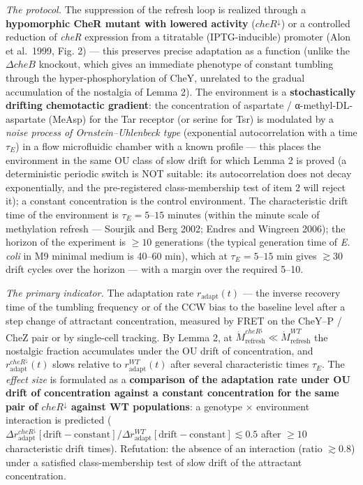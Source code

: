 \documentclass[pdflatex,sn-mathphys-ay]{sn-jnl}
\begin{document}
\emph{The protocol.} The suppression of the refresh loop is realized through a \textbf{hypomorphic CheR mutant with lowered activity} (\(cheR^{\downarrow}\)) or a controlled reduction of \emph{cheR} expression from a titratable (IPTG-inducible) promoter (Alon et al.~1999, Fig. 2) --- this preserves precise adaptation as a function (unlike the \(\Delta cheB\) knockout, which gives an immediate phenotype of constant tumbling through the hyper-phosphorylation of CheY, unrelated to the gradual accumulation of the nostalgia of Lemma 2). The environment is a \textbf{stochastically drifting chemotactic gradient}: the concentration of aspartate / α-methyl-DL-aspartate (MeAsp) for the Tar receptor (or serine for Tsr) is modulated by a \emph{noise process of Ornstein--Uhlenbeck type} (exponential autocorrelation with a time \(\tau_E\)) in a flow microfluidic chamber with a known profile --- this places the environment in the same OU class of slow drift for which Lemma 2 is proved (a deterministic periodic switch is NOT suitable: its autocorrelation does not decay exponentially, and the pre-registered class-membership test of item 2 will reject it); a constant concentration is the control environment. The characteristic drift time of the environment is \(\tau_E = 5\)--\(15\) minutes (within the minute scale of methylation refresh --- Sourjik and Berg 2002; Endres and Wingreen 2006); the horizon of the experiment is \(\ge 10\) generations (the typical generation time of \emph{E. coli} in M9 minimal medium is 40--60 min), which at \(\tau_E = 5\)--\(15\) min gives \(\gtrsim 30\) drift cycles over the horizon --- with a margin over the required 5--10.



\emph{The primary indicator.} The adaptation rate \(r_{\text{adapt}}(t)\) --- the inverse recovery time of the tumbling frequency or of the CCW bias to the baseline level after a step change of attractant concentration, measured by FRET on the CheY--P / CheZ pair or by single-cell tracking. By Lemma 2, at \(\dot M_{\text{refresh}}^{cheR^{\downarrow}} \ll \dot M_{\text{refresh}}^{WT}\) the nostalgic fraction accumulates under the OU drift of concentration, and \(r_{\text{adapt}}^{cheR^{\downarrow}}(t)\) slows relative to \(r_{\text{adapt}}^{WT}(t)\) after several characteristic times \(\tau_E\). The \emph{effect size} is formulated as a \textbf{comparison of the adaptation rate under OU drift of concentration against a constant concentration for the same pair of \(cheR^{\downarrow}\) against WT populations}: a genotype × environment interaction is predicted (\(\Delta r_{\text{adapt}}^{cheR^{\downarrow}} [\text{drift} - \text{constant}] / \Delta r_{\text{adapt}}^{WT}[\text{drift} - \text{constant}] \lesssim 0.5\) after \(\ge 10\) characteristic drift times). Refutation: the absence of an interaction (ratio \(\gtrsim 0.8\)) under a satisfied class-membership test of slow drift of the attractant concentration.
\end{document}
